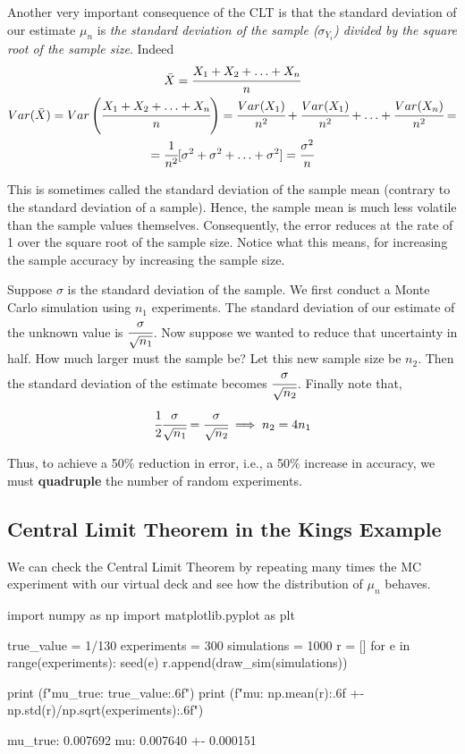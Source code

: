 Another very important consequence of the CLT is that the standard deviation of our estimate $\mu_n$ is \emph{the standard deviation of the sample ($\sigma_{Y_i}$) divided by the square root of the sample size}. Indeed
\begin{equation*}
\begin{gathered}
\bar{X} = \cfrac{X_1 + X_2 +\ldots +X_n}{n}\\
Var(\bar{X}) = Var\left(\cfrac{X_1 + X_2 +\ldots +X_n}{n}\right)=\cfrac{Var(X_1)}{n^2}+\cfrac{Var(X_1)}{n^2}+\ldots+\cfrac{Var(X_n)}{n^2} = \\
=\cfrac{1}{n^2}[\sigma^2+\sigma^2+\ldots+\sigma^2] = \cfrac{\sigma^2}{n}
\end{gathered}
\end{equation*}

This is sometimes called the standard deviation of the sample mean (contrary to the standard deviation of a sample). Hence, the sample mean is much less volatile than the sample values themselves. Consequently, the error reduces at the rate of 1 over the square root of the sample size. Notice what this means, for increasing the sample accuracy by increasing the sample size.

Suppose $\sigma$ is the standard deviation of the sample. We first conduct a Monte Carlo simulation using $n_1$ experiments. The standard deviation of our estimate of the unknown value is $\cfrac{\sigma}{\sqrt{n_1}}$. Now suppose we wanted to reduce that uncertainty in half. How much larger must the sample be? Let this new sample size be $n_2$. Then the standard deviation of the estimate becomes $\cfrac{\sigma}{\sqrt{n_2}}$.
Finally note that,
\begin{equation*}
  \cfrac{1}{2}\cfrac{\sigma}{\sqrt{n_1}}  = \cfrac{\sigma}{\sqrt{n_2}} \implies n_2 = 4 n_1
\end{equation*}

Thus, to achieve a 50\% reduction in error, i.e., a 50\% increase in accuracy, we must \textbf{quadruple} the number of random experiments.

\subsection{Central Limit Theorem in the Kings Example}

We can check the Central Limit Theorem by repeating many times the MC experiment with our virtual deck and see how the distribution of $\mu_n$ behaves.

\begin{ipython}
import numpy as np
import matplotlib.pyplot as plt

true_value = 1/130
experiments = 300
simulations = 1000
r = []
for e in range(experiments):
    seed(e)
    r.append(draw_sim(simulations))

print (f"mu_true: {true_value:.6f}")
print (f"mu: {np.mean(r):.6f} +- {np.std(r)/np.sqrt(experiments):.6f}")
\end{ipython}
\begin{ioutput}
mu_true: 0.007692
mu: 0.007640 +- 0.000151
\end{ioutput}

